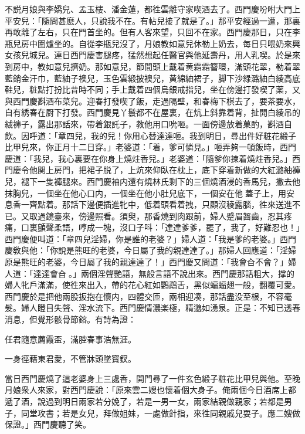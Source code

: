 不説月娘與李嬌兒、孟玉樓、潘金蓮，都徃雲離守家喫酒去了。西門慶吩咐大門上平安兒：「隨問甚麽人，只說我不在。有帖兒接了就是了。」那平安經過一遭，那裏再敢離了左右，只在門首坐的。但有人客來望，只回不在家。西門慶那日，只在李瓶兒房中圍爐坐的。自從李瓶兒沒了，月娘教如意兒休勒上奶去，每日只喂奶來興女孩兒城兒。連日西門慶害腿疼，猛然想起任醫官與他延壽丹，用人乳喫。於是來到房中，教如意兒擠奶。那如意兒，節間頭上戴着黄霜霜簪環，滿頭花翠，勒着翠藍銷金汗巾，藍紬子襖兒，玉色雲緞披襖兒，黄綿紬裙子，脚下沙緑潞紬白綾高底鞋兒，粧點打扮比昔時不同；手上戴着四個烏銀戒指兒，坐在傍邊打發喫了薬，又與西門慶斟酒布菜兒。迎春打發喫了飯，走過隔壁，和春梅下棋去了，要茶要水，自有綉春在厨下打發。西門慶見丫鬟都不在屋裏，在炕上斜靠着背，扯開白綾吊的絨褲子，露出那話來，帶着銀託子，教他用口吮咂。一面傍邊放着菓酌，斟酒自飲。因呼道：「章四兒，我的兒！你用心替達達咂。我到明日，尋出件好粧花緞子比甲兒來，你正月十二日穿。」老婆道：「着，爹可憐見。」咂弄夠一頓飯時，西門慶道：「我兒，我心裏要在你身上燒炷香兒。」老婆道：「隨爹你揀着燒炷香兒。」西門慶令他関上房門，把裙子脱了，上炕來仰臥在枕上，底下穿着新做的大紅潞紬褲兒，褪下一隻褲腿來。西門慶袖内還有燒林氏剩下的三個燒酒浸的香馬兒，撇去他抹胸兒，一個坐在他心口内，一個坐在他小肚兒底下，一個安在他𣭈蓋子上，用安息香一齊點着。那話下邊便插進牝中，低着頭看着拽，只顧沒稜露腦，徃來送進不已。又取過鏡臺來，傍邊照看。須臾，那香燒到肉跟前，婦人蹙眉齧齒，忍其疼痛，口裏顫聲柔語，哼成一塊，沒口子呌：「達達爹爹，罷了，我了，好難忍也！」西門慶便叫道：「章四兒淫婦，你是誰的老婆？」婦人道：「我是爹的老婆。」西門慶敎與他：「你說是熊旺的老婆，今日屬了我的親達達了。」那婦人回應道：「淫婦原是熊旺的老婆，今日屬了我的親達達了！」西門慶又問道：「我會㒲不會？」婦人道：「達達會㒲𣭈。」兩個淫聲艷語，無般言語不說出來。西門慶那話粗大，撑的婦人牝戶滿滿，使徃來出入，帶的花心紅如鸚鵡舌，黑似蝙蝠翅一般，翻覆可愛。西門慶於是把他兩股扳抱在懷内，四體交匝，兩相迎凑，那話盡没至根，不容毫髮。婦人瞪目失聲、淫水流下。西門慶情濃楽極，精邈如湧泉。正是：不知已透春消息，但覺形骸骨節鎔。有詩為證：

\begin{myquote}
任君隨意薦霞盃，滿腔春事浩無涯。

一身徑藉東君愛，不管牀頭墜寳釵。
\end{myquote}

當日西門慶燒了這老婆身上三處香，開門尋了一件玄色緞子粧花比甲兒與他。至晚月娘衆人來家，對西門慶說：「原來雲二嫂也懷着個大身子。俺兩個今日酒席上都遞了酒，說過到明日兩家若分娩了，若是一男一女，兩家結親做親家；若都是男子，同堂攻書；若是女兒，拜做姐妹，一處做針指，來徃同親戚兒耍子。應二嫂做保證。」西門慶聽了笑。

